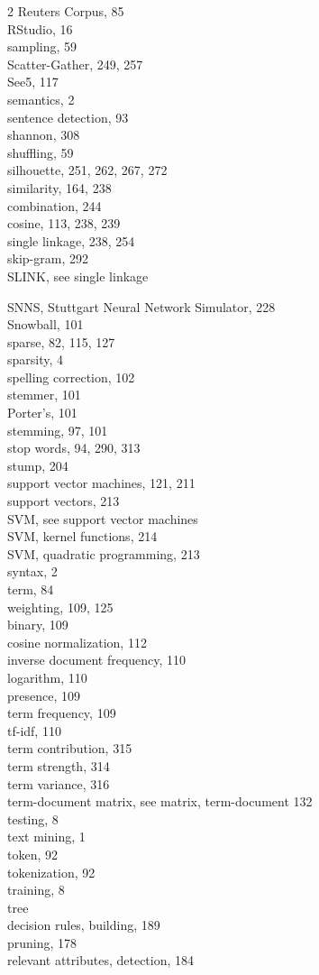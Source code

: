 \documentclass[twoside,11pt]{book}
\begin{document}
\begin{multicols}{2}
Reuters Corpus, 85\\
RStudio, 16\\
sampling, 59\\
Scatter-Gather, 249, 257\\
See5, 117\\
semantics, 2\\
sentence detection, 93\\
shannon, 308\\
shuffling, 59\\
silhouette, 251, 262, 267, 272\\
similarity, 164, 238\\
combination, 244\\
cosine, 113, 238, 239\\
single linkage, 238, 254\\
skip-gram, 292\\
SLINK, see single linkage

SNNS, Stuttgart Neural Network Simulator, 228\\
Snowball, 101\\
sparse, 82, 115, 127\\
sparsity, 4\\
spelling correction, 102\\
stemmer, 101\\
Porter's, 101\\
stemming, 97, 101\\
stop words, 94, 290, 313\\
stump, 204\\
support vector machines, 121, 211\\
support vectors, 213\\
SVM, see support vector machines\\
SVM, kernel functions, 214\\
SVM, quadratic programming, 213\\
syntax, 2\\
term, 84\\
weighting, 109, 125\\
binary, 109\\
cosine normalization, 112\\
inverse document frequency, 110\\
logarithm, 110\\
presence, 109\\
term frequency, 109\\
tf-idf, 110\\
term contribution, 315\\
term strength, 314\\
term variance, 316\\
term-document matrix, see matrix, term-document 132\\
testing, 8\\
text mining, 1\\
token, 92\\
tokenization, 92\\
training, 8\\
tree\\
decision rules, building, 189\\
pruning, 178\\
relevant attributes, detection, 184


\end{multicols}
\end{document}
